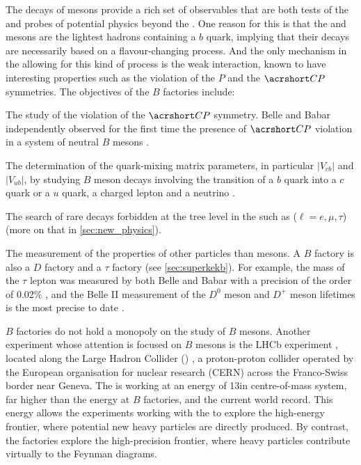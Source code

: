 The decays of \B mesons provide a rich set of observables that are both tests of the \SM and probes of potential physics beyond the \SM.
One reason for this is that the \Bp and \Bz mesons are the lightest hadrons containing a $b$ quark, implying that their decays are necessarily based on a flavour-changing process.
And the only mechanism in the \SM allowing for this kind of process is the weak interaction, known to have interesting properties such as the violation of the $P$ and the $\CP$ symmetries.
The objectives of the $B$ factories include:
\bi
\item The study of the violation of the $\CP$ symmetry.
Belle and Babar independently observed for the first time the presence of $\CP$ violation in a system of neutral $B$ mesons \cite{Belle:2001zzw, BaBar:2001pki}.
\item  The determination of the \CKM quark-mixing matrix parameters, in particular $|V_{cb}|$ and $|V_{ub}|$, by studying $B$ meson decays involving the transition of a $b$ quark into a $c$ quark or a $u$ quark, a charged lepton and a neutrino \cite{BaBar:2009zxk, Belle:2015pkj, BaBar:2016rxh, Belle:2021eni, Belle:2018ezy}.
\item The search of rare decays forbidden at the tree level in the \SM such as \BKll ($\ell=e,\mu,\tau$) \cite{BaBar:2008jdv, Belle:2009zue, BaBar:2016wgb, BELLE:2019xld} (more on that in \cref{sec:new_physics}).
\item The measurement of the properties of other particles than \B mesons.
A $B$ factory is also a $D$ factory and a $\tau$ factory (see \cref{sec:superkekb}).
For example, the mass of the $\tau$ lepton was measured by both Belle and Babar with a precision of the order of 0.02\% \cite{Belle:2006qqw, BaBar:2009qmj}, and the Belle II measurement of the $D^0$ meson and $D^+$ meson lifetimes is the most precise to date \cite{Belle-II:2021cxx}.
\ei

$B$ factories do not hold a monopoly on the study of $B$ mesons.
Another experiment whose attention is focused on $B$ mesons is the LHCb experiment \cite{LHCb:2008vvz, LHCb:2014set}, located along the Large Hadron Collider (\LHC) \cite{Evans:2008zzb}, a proton-proton collider operated by the European organisation for nuclear research (CERN) across the Franco-Swiss border near Geneva.
The \LHC is working at an energy of 13\tev in centre-of-mass system, far higher than the energy at $B$ factories, and the current world record.
This energy allows the experiments working with the \LHC to explore the high-energy frontier, where potential new heavy particles are directly produced.
By contrast, the \B factories explore the high-precision frontier, where heavy particles contribute virtually to the Feynman diagrams.

